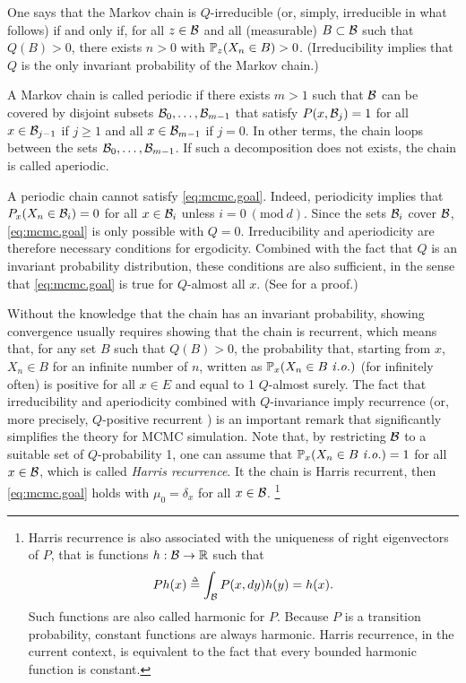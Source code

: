 One says that the Markov chain is $Q$-irreducible (or, simply, irreducible in what follows) if and only if, for all $z\in {\mathcal B}$ and all (measurable) $B\subset {\mathcal B}$ such that $Q(B)>0$, there exists $n>0$ with $\bm{\mathbb P}_z(X_n\in B) > 0$. (Irreducibility implies that $Q$ is the only invariant probability of the Markov chain.)


A Markov chain is called periodic if there exists $m>1$ such that ${\mathcal B}$ can be covered by disjoint subsets ${\mathcal B}_0, \ldots, {\mathcal B}_{m-1}$ that satisfy $P(x, {\mathcal B}_j) = 1$ for all $x\in {\mathcal B}_{j-1}$ if $j\geq 1$ and all $x\in {\mathcal B}_{m-1}$ if $j=0$. In other terms, the chain loops between the sets  ${\mathcal B}_0, \ldots, {\mathcal B}_{m-1}$. If such a decomposition does not exists, the chain is called aperiodic. 

A periodic chain cannot satisfy \cref{eq:mcmc.goal}. Indeed, periodicity implies that $P_x(X_n \in {\mathcal B}_i) = 0$ for all $x\in {\mathcal B}_i$ unless $i = 0\ (\mathrm{mod}\ d)$. Since the sets ${\mathcal B}_i$ cover ${\mathcal B}$, \cref{eq:mcmc.goal} is only possible with $Q=0$.  Irreducibility and aperiodicity are therefore necessary conditions for ergodicity. Combined with the fact that $Q$ is an invariant probability distribution, these conditions are also sufficient, in the sense that \cref{eq:mcmc.goal} is true for  $Q$-almost all $x$. (See \cite{tierney1994markov} for a proof.)

 Without the knowledge that the chain has an invariant probability, showing convergence usually requires showing that the chain is recurrent, which means that, for any set $B$ such that $Q(B) > 0$, the probability that, starting from $x$, $X_n\in B$ for an infinite number of $n$, written as $\myP_x(X_n \in B\ \mathit{i.o.})$ (for infinitely often) is positive for all $x\in E$ and equal to 1 $Q$-almost surely. The fact that irreducibility and aperiodicity combined with $Q$-invariance imply recurrence (or, more precisely, $Q$-positive recurrent \citep{nummelin2004general}) is an important remark that significantly simplifies the theory for MCMC simulation. Note that, by restricting ${\mathcal B}$ to a suitable set of $Q$-probability 1, one can assume that $\myP_x(X_n \in B \ \mathit{i.o.}) = 1$ for all $x\in {\mathcal B}$, which is called {\em Harris recurrence}.  It the chain is Harris recurrent, then \cref{eq:mcmc.goal} holds with $\mu_0 = \delta_x$ for all $x\in {\mathcal B}$. \footnote{Harris recurrence is also associated with the uniqueness of right eigenvectors of $P$, that is functions $h: {\mathcal B} \to {\mathbb{R}}$ such that
\[
Ph(x) \stackrel{{\scriptscriptstyle \Delta}}{=} \int_{{\mathcal B}} P(x, dy) h(y)  = h(x).
\]
Such functions are also called harmonic for $P$.
Because $P$ is a transition probability, constant functions are always harmonic. Harris recurrence, in the current context, is equivalent to the fact that every bounded harmonic function is constant.}


